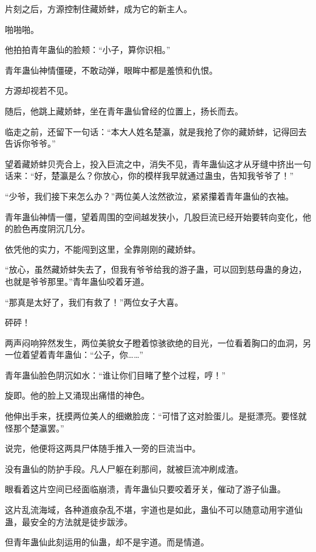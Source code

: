 
\begin{this_body}

片刻之后，方源控制住藏娇蚌，成为它的新主人。

啪啪啪。

他拍拍青年蛊仙的脸颊：“小子，算你识相。”

青年蛊仙神情僵硬，不敢动弹，眼眸中都是羞愤和仇恨。

方源却视若不见。

随后，他跳上藏娇蚌，坐在青年蛊仙曾经的位置上，扬长而去。

临走之前，还留下一句话：“本大人姓名楚瀛，就是我抢了你的藏娇蚌，记得回去告诉你爷爷。”

望着藏娇蚌贝壳合上，投入巨流之中，消失不见，青年蛊仙这才从牙缝中挤出一句话来：“好，楚瀛是么？你放心，你的模样我早就通过蛊虫，告知我爷爷了！”

“少爷，我们接下来怎么办？”两位美人泫然欲泣，紧紧攥着青年蛊仙的衣袖。

青年蛊仙神情一僵，望着周围的空间越发狭小，几股巨流已经开始要转向变化，他的脸色再度阴沉几分。

依凭他的实力，不能闯到这里，全靠刚刚的藏娇蚌。

“放心，虽然藏娇蚌失去了，但我有爷爷给我的游子蛊，可以回到慈母蛊的身边，也就是爷爷那里。”青年蛊仙咬着牙道。

“那真是太好了，我们有救了！”两位女子大喜。

砰砰！

两声闷响猝然发生，两位美貌女子瞪着惊骇欲绝的目光，一位看着胸口的血洞，另一位着望着青年蛊仙：“公子，你……”

青年蛊仙脸色阴沉如水：“谁让你们目睹了整个过程，哼！”

旋即。他的脸上又涌现出痛惜的神色。

他伸出手来，抚摸两位美人的细嫩脸庞：“可惜了这对脸蛋儿。是挺漂亮。要怪就怪那个楚瀛罢。”

说完，他便将这两具尸体随手推入一旁的巨流当中。

没有蛊仙的防护手段。凡人尸躯在刹那间，就被巨流冲刷成渣。

眼看着这片空间已经面临崩溃，青年蛊仙只要咬着牙关，催动了游子仙蛊。

这片乱流海域，各种道痕杂乱不堪，宇道也是如此，蛊仙不可以随意动用宇道仙蛊，最安全的方法就是徒步跋涉。

但青年蛊仙此刻运用的仙蛊，却不是宇道。而是情道。


\end{this_body}

